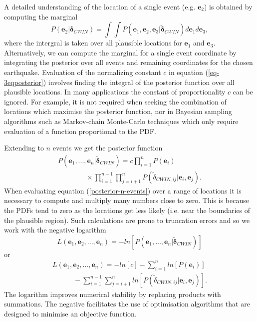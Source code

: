 \documentclass[extra, onecolumn, doublespacing]{gji}
\begin{document}
A detailed understanding of the location of a single event (e.g. $\mathbf{e}_2$) is obtained by computing the
marginal
\begin{equation}
\label{eq:-E2-marginal}
P(\mathbf{e}_2|\mathbf{\delta}_{CWIN}) = \int \int P(\mathbf{e}_1, \mathbf{e}_2,
 \mathbf{e}_3 | \widetilde{\mathbf{\delta}}_{CWIN}) d\mathbf{e}_1
 d\mathbf{e}_3,
\end{equation}
where the intergral is taken over all plausible locations for
$\mathbf{e}_1$ and $\mathbf{e}_3$. Alternatively, we can compute the
marginal for a single event coordinate by integrating the posterior
over all events and remaining coordinates for the chosen earthquake.
Evaluation of the normalizing constant $c$ in equation (\ref{eq-3eqposterior}) involves
finding the integral of the posterior function
over all plausible locations. In many applications the constant
of proportionality $c$ can be ignored. For example, it is not
required when seeking the combination of locations which maximise
 the posterior function, nor in Bayesian sampling algorithms such as Markov-chain Monte-Carlo
techniques which only require evaluation of a function proportional to the PDF.

Extending to $n$ events we get the posterior function
\begin{equation}
\begin{array}{l}
\label{posterior-n-events}
P(\mathbf{e}_1,...,\mathbf{e}_n | \widetilde{\mathbf{\delta}}_{CWIN}) = c \displaystyle \prod_{i=1}^n P(\mathbf{e}_i) \\
\hspace{4em} \displaystyle  \times \prod_{i=1}^{n-1} \prod_{j=i+1}^n P(\widetilde{\delta}_{CWIN,ij}|\mathbf{e}_i,\mathbf{e}_j).
\end{array}
\end{equation}
When evaluating equation (\ref{posterior-n-events})
over a range of locations it is necessary to compute and multiply
many numbers close to zero. This is because the PDFs tend to zero as
the locations get less likely (i.e. near the boundaries of the
plausible region). Such calculations are prone to truncation errors
and so we work with the negative logarithm
\begin{equation}
\label{eq:-negative-log-part1}
L(\mathbf{e}_1, \mathbf{e}_2, ..., \mathbf{e}_n) = -ln\left[ P(\mathbf{e}_1,...,\mathbf{e}_n | \widetilde{\mathbf{\delta}}_{CWIN} )  \right]
\end{equation}
or
\begin{equation}
\begin{array}{l}
\label{eq:-negative-log}
L(\mathbf{e}_1, \mathbf{e}_2, ..., \mathbf{e}_n) =
-ln\left[ c \right] - \displaystyle \sum_{i=1}^n ln\left[P(\mathbf{e}_i)\right] \\
\hspace{3em} - \displaystyle \sum_{i=1}^{n-1} \sum_{j=i+1}^n ln\left[P(\widetilde{\delta}_{CWIN,ij}|\mathbf{e}_i,\mathbf{e}_j)\right].
\end{array}
\end{equation}
The logarithm improves numerical stability by replacing products
with summations. The negative facilitates the use of optimisation
algorithms that are designed to minimise an objective function.
\end{document}
